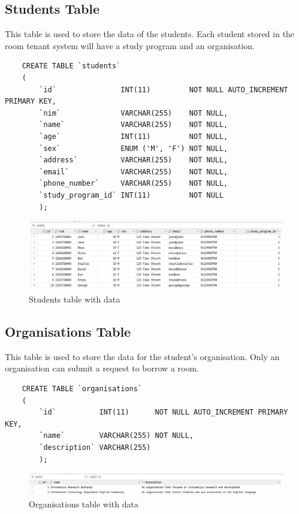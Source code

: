 \documentclass[12pt,titlepage]{article}
\begin{document}
\subsection{Students Table}
This table is used to store the data of the students. Each student stored in the room tenant system will have a study program
and an organisation.

\begin{verbatim}
    CREATE TABLE `students`
    (
        `id`               INT(11)         NOT NULL AUTO_INCREMENT PRIMARY KEY,
        `nim`              VARCHAR(255)    NOT NULL,
        `name`             VARCHAR(255)    NOT NULL,
        `age`              INT(11)         NOT NULL,
        `sex`              ENUM ('M', 'F') NOT NULL,
        `address`          VARCHAR(255)    NOT NULL,
        `email`            VARCHAR(255)    NOT NULL,
        `phone_number`     VARCHAR(255)    NOT NULL,
        `study_program_id` INT(11)         NOT NULL
        );
    \end{verbatim}

\begin{figure}[h]
    \centering
    \includegraphics[width=\textwidth]{./images/students-table.png}
    \caption{Students table with data}
\end{figure}

\pagebreak

\subsection{Organisations Table}
This table is used to store the data for the student's organisation. 
Only an organisation can submit a request to borrow a room.

\begin{verbatim}
    CREATE TABLE `organisations`
    (
        `id`          INT(11)      NOT NULL AUTO_INCREMENT PRIMARY KEY,
        `name`        VARCHAR(255) NOT NULL,
        `description` VARCHAR(255)
        );
    \end{verbatim}
    
    \begin{figure}[h]
        \centering
        \includegraphics[width=\textwidth]{./images/organisations-table.png}
    \caption{Organisations table with data}
\end{figure}
\end{document}

